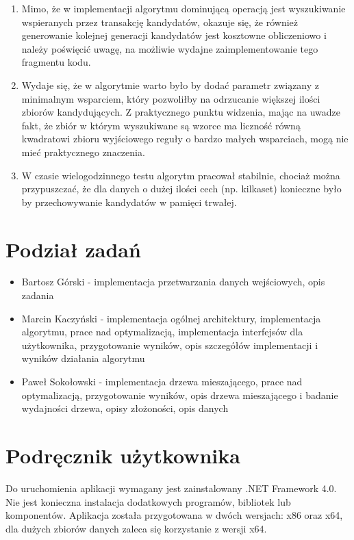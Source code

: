 \documentclass[a4paper,12pt]{article}
\begin{document}
\begin{enumerate}

\item Mimo, że w implementacji algorytmu dominującą operacją jest wyszukiwanie wspieranych przez transakcję kandydatów, okazuje się, że również generowanie kolejnej generacji kandydatów jest kosztowne obliczeniowo i należy poświęcić uwagę, na możliwie wydajne zaimplementowanie tego fragmentu kodu. 

\item Wydaje się, że w algorytmie warto było by dodać parametr związany z minimalnym wsparciem, który pozwoliłby na odrzucanie większej ilości zbiorów kandydujących. Z praktycznego punktu widzenia, mając na uwadze fakt, że zbiór w którym wyszukiwane są wzorce ma liczność równą kwadratowi zbioru wyjściowego reguły o bardzo małych wsparciach, mogą nie mieć praktycznego znaczenia.

\item W czasie wielogodzinnego testu algorytm pracował stabilnie, chociaż można przypuszczać, że dla danych o dużej ilości cech (np. kilkaset) konieczne było by przechowywanie kandydatów w pamięci trwałej.

\end{enumerate}

\section{Podział zadań}

\begin{itemize}
\item Bartosz Górski - implementacja przetwarzania danych wejściowych, opis zadania
\item Marcin Kaczyński - implementacja ogólnej architektury, implementacja algorytmu, prace nad optymalizacją, implementacja interfejsów dla użytkownika, przygotowanie wyników, opis szczegółów implementacji i wyników działania algorytmu
\item Paweł Sokołowski - implementacja drzewa mieszającego, prace nad optymalizacją, przygotowanie wyników, opis drzewa mieszającego i badanie wydajności drzewa, opisy złożoności, opis danych
\end{itemize}

\appendix
\section{Podręcznik użytkownika}

Do uruchomienia aplikacji wymagany jest zainstalowany .NET Framework 4.0. Nie jest konieczna instalacja dodatkowych programów, bibliotek lub komponentów. Aplikacja została przygotowana w dwóch wersjach: x86 oraz x64, dla dużych zbiorów danych zaleca się korzystanie z wersji x64.\\
\end{document}
